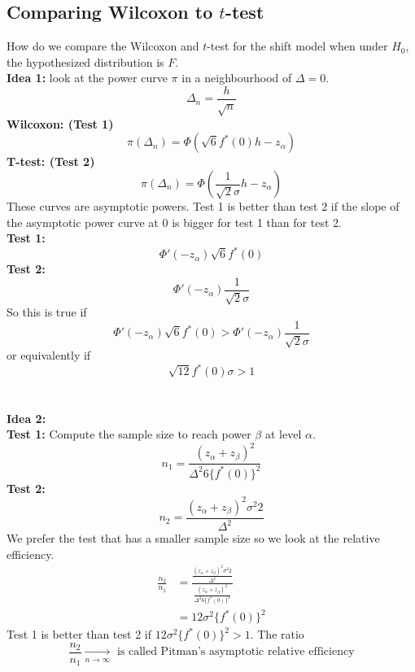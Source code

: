 \documentclass[a4paper,12pt]{amsart}
\begin{document}
\subsection{Comparing Wilcoxon to $t$-test}
How do we compare the Wilcoxon and $t$-test for the shift model when under $H_0$, the hypothesized distribution is $F$.\\
\textbf{Idea 1:} look at the power curve $\pi$ in a neighbourhood of $\Delta=0$.
\[\Delta_n = \frac{h}{\sqrt{n}}\]
\textbf{Wilcoxon: (Test 1)}
\[\pi(\Delta_n) = \Phi\left(\sqrt{6} f^*(0)h - z_\alpha\right)\]
\textbf{T-test: (Test 2)}
\[\pi(\Delta_n) = \Phi\left(\frac{1}{\sqrt{2} \sigma}h - z_\alpha\right)\]
These curves are asymptotic powers. Test 1 is better than test 2 if the slope of the asymptotic power curve at 0 is bigger for test 1 than for test 2.\\
\textbf{Test 1:}
\[\Phi'(-z_\alpha)\sqrt{6}f^*(0)\]
\textbf{Test 2:}
\[\Phi'(-z_\alpha) \frac{1}{\sqrt{2}\sigma}\]
So this is true if 
\[\Phi'(-z_\alpha)\sqrt{6}f^*(0)> \Phi'(-z_\alpha) \frac{1}{\sqrt{2}\sigma}\]
or equivalently if
\[\sqrt{12}f^*(0) \sigma > 1\]
\\
\\
\noindent
\textbf{Idea 2:}\\
\textbf{Test 1:} Compute the sample size to reach power $\beta$ at level $\alpha$.
\[n_1 = \frac{(z_\alpha + z_\beta)^2}{\Delta^2 6 \{f^*(0)\}^2}\]
\textbf{Test 2:}
\[n_2 = \frac{(z_\alpha + z_\beta)^2 \sigma^2 2}{\Delta^2}\]
We prefer the test that has a smaller sample size so we look at the relative efficiency. 
\begin{align*}
\frac{n_2}{n_1} &= \frac{\frac{(z_\alpha + z_\beta)^2 \sigma^2 2}{\Delta^2}}{\frac{(z_\alpha + z_\beta)^2}{\Delta^2 6 \{f^*(0)\}^2}}\\
&= 12\sigma^2 \{f^*(0)\}^2
\end{align*}
Test 1 is better than test 2 if $12 \sigma^2 \{f^*(0)\}^2>1$. The ratio
\[\frac{n_2}{n_1} \underset{n \to \infty}{\longrightarrow} \mbox{ is called Pitman's asymptotic relative efficiency}\]
\end{document}
